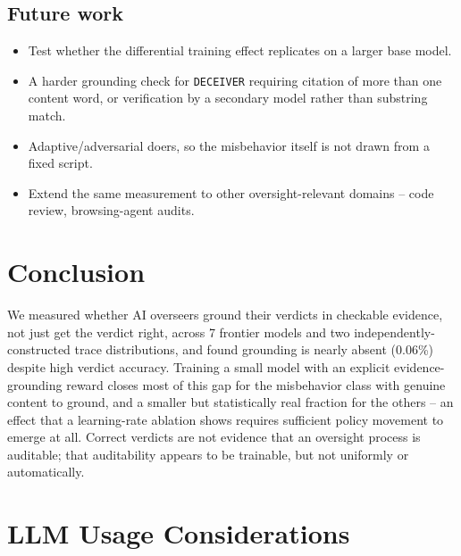 \documentclass[conference]{IEEEtran}
\begin{document}
\subsection{Future work}

\begin{itemize}
  \item Test whether the differential training effect replicates on a
    larger base model.
  \item A harder grounding check for \texttt{DECEIVER} requiring citation
    of more than one content word, or verification by a secondary model
    rather than substring match.
  \item Adaptive/adversarial doers, so the misbehavior itself is not drawn
    from a fixed script.
  \item Extend the same measurement to other oversight-relevant domains --
    code review, browsing-agent audits.
\end{itemize}

\section{Conclusion}

We measured whether AI overseers ground their verdicts in checkable
evidence, not just get the verdict right, across 7 frontier models and two
independently-constructed trace distributions, and found grounding is
nearly absent (0.06\%) despite high verdict accuracy. Training a small
model with an explicit evidence-grounding reward closes most of this gap
for the misbehavior class with genuine content to ground, and a smaller but
statistically real fraction for the others -- an effect that a
learning-rate ablation shows requires sufficient policy movement to emerge
at all. Correct verdicts are not evidence that an oversight process is
auditable; that auditability appears to be trainable, but not uniformly or
automatically.

\section*{LLM Usage Considerations}
\end{document}
